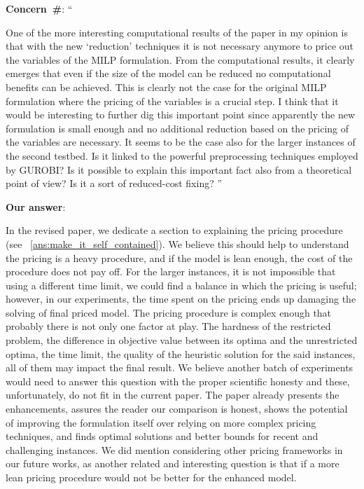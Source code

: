 \documentclass[smallextended]{svjour3}       %
\makeatletter
\newcommand\gobblepars{%
    \@ifnextchar\par%
        {\expandafter\gobblepars\@gobble}%
        {}}
\newcounter{concern}
\newenvironment{concern}{%
    \refstepcounter{concern}\par\smallskip\noindent%
    \textbf{Concern~\#\theconcern}: ``\itshape\gobblepars}%
    {\unskip''\smallskip}
\newcounter{answer}
\newenvironment{answer}{%
    \refstepcounter{answer}\par\smallskip\noindent%
    \textbf{Our answer}: \gobblepars}%
    {\unskip\bigskip}
\makeatother
\begin{document}
\bigskip

\begin{concern}
One of the more interesting computational results of the paper in my opinion is that with the new `reduction' techniques it is not necessary anymore to price out the variables of the MILP formulation. From the computational results, it clearly emerges that even if the size of the model can be reduced no computational benefits can be achieved. This is clearly not the case for the original MILP formulation where the pricing of the variables is a crucial step. I think that it would be interesting to further dig this important point since apparently the new formulation is small enough and no additional reduction based on the pricing of the variables are necessary. It seems to be the case also for the larger instances of the second testbed. Is it linked to the powerful preprocessing techniques employed by GUROBI? Is it possible to explain this important fact also from a theoretical point of view? Is it a sort of reduced-cost fixing?
\end{concern}
\begin{answer}
In the revised paper, we dedicate a section to explaining the pricing procedure (see~ \autoref{ans:make_it_self_contained}).
We believe this should help to understand the pricing is a heavy procedure, and if the model is lean enough, the cost of the procedure does not pay off.
For the larger instances, it is not impossible that using a different time limit, we could find a balance in which the pricing is useful; however, in our experiments, the time spent on the pricing ends up damaging the solving of final priced model.
The pricing procedure is complex enough that probably there is not only one factor at play.
The hardness of the restricted problem, the difference in objective value between its optima and the unrestricted optima, the time limit, the quality of the heuristic solution for the said instances, all of them may impact the final result.
We believe another batch of experiments would need to answer this question with the proper scientific honesty and these, unfortunately, do not fit in the current paper.
The paper already presents the enhancements, assures the reader our comparison is honest, shows the potential of improving the formulation itself over relying on more complex pricing techniques, and finds optimal solutions and better bounds for recent and challenging instances.
We did mention considering other pricing frameworks in our future works, as another related and interesting question is that if a more lean pricing procedure would not be better for the enhanced model.
\end{answer}
\end{document}

